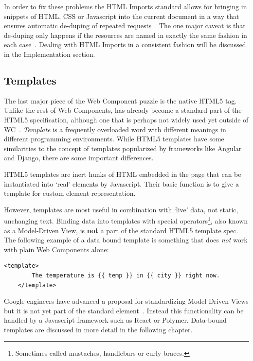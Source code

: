 In order to fix these problems the HTML Imports standard allows for bringing in snippets of HTML, CSS or Javascript into the current document in a way that ensures automatic de-duping of repeated requests~\cite{w3ccontributors2015-a}.
The one major caveat is that de-duping only happens if the resources are named in exactly the same fashion in each case~\cite{bidelman2013}.
Dealing with HTML Imports in a consistent fashion will be discussed in the Implementation section.

\subsection{Templates}
The last major piece of the Web Component puzzle is the native HTML5  tag. 
Unlike the rest of Web Components,  has already become a standard part of the HTML5 specification, 
although one that is perhaps not widely used yet outside of WC~\cite{w3ccontributors2015-c}.
\textit{Template} is a frequently overloaded word with different meanings in different programming environments.
While HTML5 templates have some similarities to the concept of templates popularized by frameworks like Angular and Django, there are some important differences.

HTML5 templates are inert hunks of HTML embedded in the page that can be instantiated into `real' elements by Javascript.
Their basic function is to give a template for custom element representation.

However, templates are most useful in combination with `live' data, not static, unchanging text.
Binding data into templates with special operators\footnote{
Sometimes called mustaches, handlebars or curly braces. },
also known as a Model-Driven View,
is \textbf{not} a part of the standard HTML5 template spec.
The following example of a data bound template is something that does \textit{not} work with plain Web Components alone:

\begin{lstlisting}[language=HTML5,numbers=none]
	<template> 
		The temperature is {{ temp }} in {{ city }} right now.
	</template>
\end{lstlisting}

Google engineers have advanced a proposal for standardizing 
Model-Driven Views
but it is not yet part of the standard  element~\cite{googledevelopers2014}.
Instead this functionality can be handled by a Javascript framework such as React or Polymer.
Data-bound templates are discussed in more detail in the following chapter.

